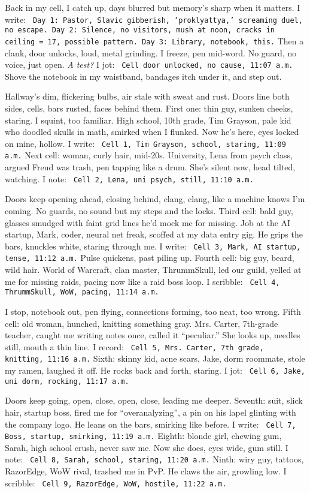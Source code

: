 \documentclass[12pt]{article}
\newcommand{\note}[1]{\texttt{\small \color{DarkGray} #1}}
\begin{document}
Back in my cell, I catch up, days blurred but memory’s sharp when it matters. I write: \note{Day 1: Pastor, Slavic gibberish, ‘proklyattya,’ screaming duel, no escape. Day 2: Silence, no visitors, mush at noon, cracks in ceiling = 17, possible pattern. Day 3: Library, notebook, this.} Then a clank, door unlocks, loud, metal grinding. I freeze, pen mid-word. No guard, no voice, just open. \textit{A test?} I jot: \note{Cell door unlocked, no cause, 11:07 a.m.} Shove the notebook in my waistband, bandages itch under it, and step out.

Hallway’s dim, flickering bulbs, air stale with sweat and rust. Doors line both sides, cells, bars rusted, faces behind them. First one: thin guy, sunken cheeks, staring. I squint, too familiar. High school, 10th grade, \textnormal{Tim Grayson}, pale kid who doodled skulls in math, smirked when I flunked. Now he’s here, eyes locked on mine, hollow. I write: \note{Cell 1, Tim Grayson, school, staring, 11:09 a.m.} Next cell: woman, curly hair, mid-20s. University, \textnormal{Lena} from psych class, argued Freud was trash, pen tapping like a drum. She’s silent now, head tilted, watching. I note: \note{Cell 2, Lena, uni psych, still, 11:10 a.m.}

Doors keep opening ahead, closing behind, clang, clang, like a machine knows I’m coming. No guards, no sound but my steps and the locks. Third cell: bald guy, glasses smudged with faint grid lines he’d mock me for missing. Job at the AI startup, \textnormal{Mark}, coder, neural net freak, scoffed at my data entry gig. He grips the bars, knuckles white, staring through me. I write: \note{Cell 3, Mark, AI startup, tense, 11:12 a.m.} Pulse quickens, past piling up. Fourth cell: big guy, beard, wild hair. World of Warcraft, clan master, \textnormal{ThrummSkull}, led our guild, yelled at me for missing raids, pacing now like a raid boss loop. I scribble: \note{Cell 4, ThrummSkull, WoW, pacing, 11:14 a.m.}

I stop, notebook out, pen flying, connections forming, too neat, too wrong. Fifth cell: old woman, hunched, knitting something gray. \textnormal{Mrs. Carter}, 7th-grade teacher, caught me writing notes once, called it “peculiar.” She looks up, needles still, mouth a thin line. I record: \note{Cell 5, Mrs. Carter, 7th grade, knitting, 11:16 a.m.} Sixth: skinny kid, acne scars, \textnormal{Jake}, dorm roommate, stole my ramen, laughed it off. He rocks back and forth, staring. I jot: \note{Cell 6, Jake, uni dorm, rocking, 11:17 a.m.}

Doors keep going, open, close, open, close, leading me deeper. Seventh: suit, slick hair, startup boss, fired me for “overanalyzing”, a pin on his lapel glinting with the company logo. He leans on the bars, smirking like before. I write: \note{Cell 7, Boss, startup, smirking, 11:19 a.m.} Eighth: blonde girl, chewing gum, \textnormal{Sarah}, high school crush, never saw me. Now she does, eyes wide, gum still. I note: \note{Cell 8, Sarah, school, staring, 11:20 a.m.} Ninth: wiry guy, tattoos, \textnormal{RazorEdge}, WoW rival, trashed me in PvP. He claws the air, growling low. I scribble: \note{Cell 9, RazorEdge, WoW, hostile, 11:22 a.m.}
\end{document}
